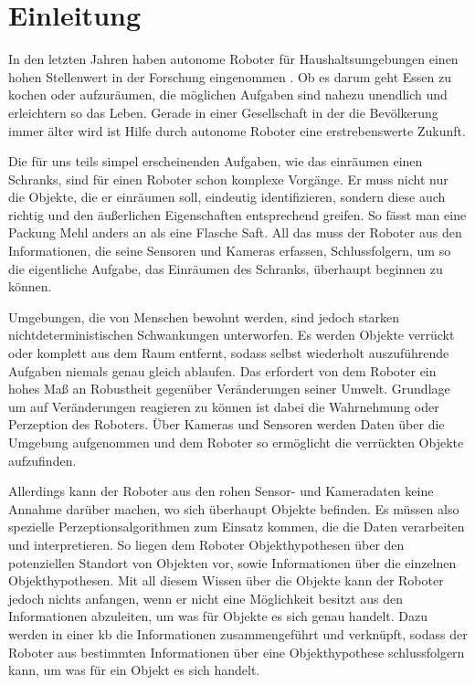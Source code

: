 \graphicspath{{./images/}}      
\def\CHAPTERONE{./chapters/Chapter-1} 

\chapter{Einleitung}
\label{chap:introduction}
%	
In den letzten Jahren haben autonome Roboter für Haushaltsumgebungen einen hohen Stellenwert in der Forschung eingenommen . Ob es darum geht Essen zu kochen oder aufzuräumen, die möglichen Aufgaben sind nahezu unendlich und erleichtern so das Leben. Gerade in einer Gesellschaft in der die Bevölkerung immer älter wird \cite{peopleGetOlder} ist Hilfe durch autonome Roboter eine erstrebenswerte Zukunft. \par
Die für uns teils simpel erscheinenden Aufgaben, wie das einräumen einen Schranks, sind für einen Roboter schon komplexe Vorgänge. Er muss nicht nur die Objekte, die er einräumen soll, eindeutig identifizieren, sondern diese auch richtig und den äußerlichen Eigenschaften entsprechend greifen. So fässt man eine Packung Mehl anders an als eine Flasche Saft. All das muss der Roboter aus den Informationen, die seine Sensoren und Kameras erfassen, Schlussfolgern, um so die eigentliche Aufgabe, das Einräumen des Schranks, überhaupt beginnen zu können. \par
Umgebungen, die von Menschen bewohnt werden, sind jedoch starken nichtdeterministischen Schwankungen unterworfen. Es werden Objekte verrückt oder komplett aus dem Raum entfernt, sodass selbst wiederholt auszuführende Aufgaben niemals genau gleich ablaufen. Das erfordert von dem Roboter ein hohes Maß an Robustheit gegenüber Veränderungen seiner Umwelt. Grundlage um auf Veränderungen reagieren zu können ist dabei die Wahrnehmung oder Perzeption des Roboters. Über Kameras und Sensoren werden Daten über die Umgebung aufgenommen und dem Roboter so ermöglicht die verrückten Objekte aufzufinden. \par 
Allerdings kann der Roboter aus den rohen Sensor- und Kameradaten keine Annahme darüber machen, wo sich überhaupt Objekte befinden. Es müssen also spezielle Perzeptionsalgorithmen zum Einsatz kommen, die die Daten verarbeiten und interpretieren. So liegen dem Roboter Objekthypothesen über den potenziellen Standort von Objekten vor, sowie Informationen über die einzelnen Objekthypothesen. Mit all diesem Wissen über die Objekte kann der Roboter jedoch nichts anfangen, wenn er nicht eine Möglichkeit besitzt aus den Informationen abzuleiten, um was für Objekte es sich genau handelt. Dazu werden in einer \gls{kb} die Informationen zusammengeführt und verknüpft, sodass der Roboter aus bestimmten Informationen über eine Objekthypothese schlussfolgern kann, um was für ein Objekt es sich handelt.    \par    
